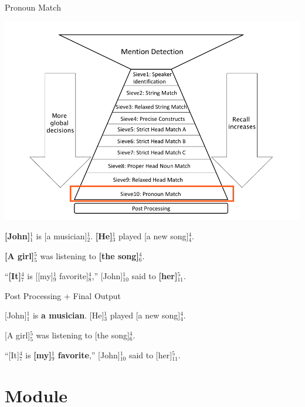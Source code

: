 \documentclass[11pt,a4paper]{beamer}
\begin{document}
\begin{frame}{Pronoun Match}

\includegraphics[scale=0.15]{sieve10.png} 
\bigskip

\textbf{[John]}$^{1}_{1}$ is [a musician]$^{1}_{2}$. \textbf{[He]}$^{1}_{3}$ played [a new song]$^{4}_{4}$.

\textbf{[A girl]}$^{5}_{5}$ was listening to \textbf{[the song]}$^{4}_{6}$.

“\textbf{[It]}$^{4}_{7}$ is [[my]$^{1}_{9}$ favorite]$^{4}_{8}$,” [John]$^{1}_{10}$ said to \textbf{[her]}$^{5}_{11}$.

\end{frame}

\begin{frame}{Post Processing + Final Output}

[John]$^{1}_{1}$ is \textbf{a musician}. [He]$^{1}_{3}$ played [a new song]$^{4}_{4}$.

[A girl]$^{5}_{5}$ was listening to [the song]$^{4}_{6}$.

“[It]$^{4}_{7}$ is \textbf{[my]$^{1}_{9}$ favorite},” [John]$^{1}_{10}$ said to [her]$^{5}_{11}$.


\begin{quote}
\bigskip
{}
\end{quote}
\end{frame}


\section{Module}
\end{document}
